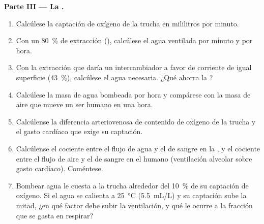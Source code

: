 \begin{problem}
\medskip
\noindent\textbf{Parte III --- La .}
\begin{enumerate}[resume]
  \item Calcúlese la captación de oxígeno de la trucha en mililitros por
        minuto.
  \item Con un \qty{80}{\%} de extracción (), calcúlese el
        agua ventilada por minuto y por hora.
  \item Con la extracción que daría un intercambiador a favor de corriente
        de igual superficie (\qty{43}{\%}), calcúlese el agua necesaria.
        ¿Qué ahorra la ?
  \item Calcúlese la masa de agua bombeada por hora y compárese con la masa
        de aire que mueve un ser humano en una hora.
  \item Calcúlense la diferencia arteriovenosa de contenido de oxígeno de
        la trucha y el gasto cardíaco que exige su captación.
  \item Calcúlense el cociente entre el flujo de agua y el de sangre en la
        , y el cociente entre el flujo de aire y el de sangre en el
         humano (ventilación alveolar sobre gasto cardíaco).
        Coméntese.
  \item Bombear agua le cuesta a la trucha alrededor del \qty{10}{\%} de su
        captación de oxígeno. Si el agua se calienta a \qty{25}{\celsius}
        (\qty{5.5}{mL/L}) y su captación sube la mitad, ¿en qué factor debe
        subir la ventilación, y qué le ocurre a la fracción que se gasta en
        respirar?
\end{enumerate}


\end{problem}
